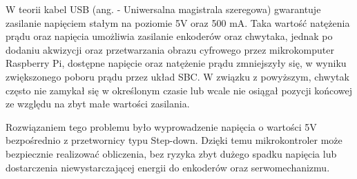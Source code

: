 W teorii kabel USB (ang.  - Uniwersalna magistrala szeregowa) gwarantuje zasilanie napięciem stałym na poziomie 5V oraz 500 mA. Taka wartość natężenia prądu oraz napięcia umożliwia zasilanie enkoderów oraz chwytaka, jednak po dodaniu akwizycji oraz przetwarzania obrazu cyfrowego przez mikrokomputer Raspberry Pi, dostępne napięcie oraz natężenie prądu zmniejszyły się, w wyniku zwiększonego poboru prądu przez układ SBC. W związku z powyższym, chwytak często nie zamykał się w określonym czasie lub wcale nie osiągał pozycji końcowej ze względu na zbyt małe wartości zasilania. 

Rozwiązaniem tego problemu było wyprowadzenie napięcia o wartości 5V bezpośrednio z przetwornicy typu Step-down. Dzięki temu mikrokontroler może bezpiecznie realizować obliczenia, bez ryzyka zbyt dużego spadku napięcia lub dostarczenia niewystarczającej energii do enkoderów oraz serwomechanizmu. 
